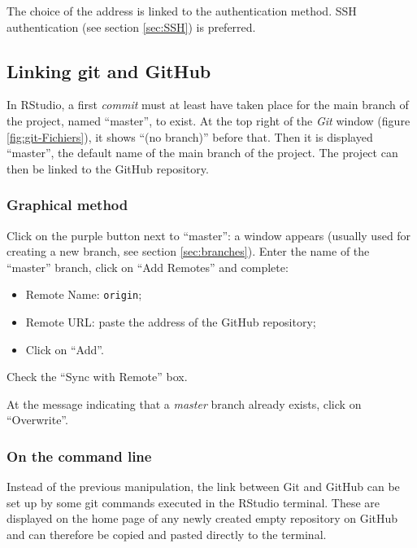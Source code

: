 \documentclass[
  12pt,
  american,
  a4paper,
  extrafontsizes,onecolumn,openright
  ]{memoir}
\providecommand{\tightlist}{%
  \setlength{\itemsep}{0pt}\setlength{\parskip}{0pt}}
\begin{document}
The choice of the address is linked to the authentication method.
SSH authentication (see section \ref{sec:SSH}) is preferred.

\hypertarget{linking-git-and-github}{%
\subsection{Linking git and GitHub}\label{linking-git-and-github}}

In RStudio, a first \emph{commit} must at least have taken place for the main branch of the project, named \enquote{master}, to exist.
At the top right of the \emph{Git} window (figure \ref{fig:git-Fichiers}), it shows \enquote{(no branch)} before that.
Then it is displayed \enquote{master}, the default name of the main branch of the project.
The project can then be linked to the GitHub repository.

\hypertarget{graphical-method}{%
\subsubsection{Graphical method}\label{graphical-method}}

Click on the purple button next to \enquote{master}: a window appears (usually used for creating a new branch, see section \ref{sec:branches}).
Enter the name of the \enquote{master} branch, click on \enquote{Add Remotes} and complete:

\begin{itemize}
\tightlist
\item
  Remote Name: \texttt{origin};
\item
  Remote URL: paste the address of the GitHub repository;
\item
  Click on \enquote{Add}.
\end{itemize}

Check the \enquote{Sync with Remote} box.

At the message indicating that a \emph{master} branch already exists, click on \enquote{Overwrite}.

\hypertarget{on-the-command-line}{%
\subsubsection{On the command line}\label{on-the-command-line}}

Instead of the previous manipulation, the link between Git and GitHub can be set up by some git commands executed in the RStudio terminal.
These are displayed on the home page of any newly created empty repository on GitHub and can therefore be copied and pasted directly to the terminal.
\end{document}
